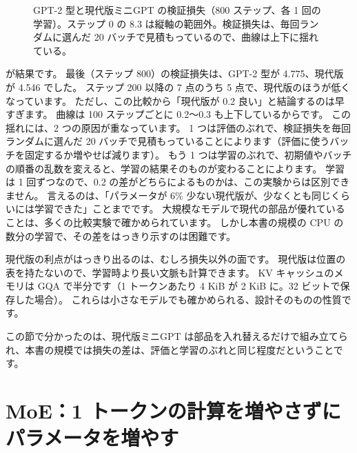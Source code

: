 \begin{figure}[tbp]
\centering
{}
\caption{GPT-2 型と現代版ミニGPT の検証損失（800 ステップ、各 1 回の学習）。ステップ 0 の 8.3 は縦軸の範囲外。検証損失は、毎回ランダムに選んだ 20 バッチで見積もっているので、曲線は上下に揺れている。}
\label{fig:ma-compare}
\end{figure}

が結果です。
最後（ステップ 800）の検証損失は、GPT-2 型が 4.775、現代版が 4.546 でした。
ステップ 200 以降の 7 点のうち 5 点で、現代版のほうが低くなっています。
ただし、この比較から「現代版が 0.2 良い」と結論するのは早すぎます。
曲線は 100 ステップごとに 0.2〜0.3 も上下しているからです。
この揺れには、2 つの原因が重なっています。
1 つは評価のぶれで、検証損失を毎回ランダムに選んだ 20 バッチで見積もっていることによります（評価に使うバッチを固定するか増やせば減ります）。
もう 1 つは学習のぶれで、初期値やバッチの順番の乱数を変えると、学習の結果そのものが変わることによります。
学習は 1 回ずつなので、0.2 の差がどちらによるものかは、この実験からは区別できません。
言えるのは、「パラメータが 6\% 少ない現代版が、少なくとも同じくらいには学習できた」ことまでです。
大規模なモデルで現代の部品が優れていることは、多くの比較実験で確かめられています\cite{shazeer2020glu,su2024roformer,touvron2023llama}。
しかし本書の規模の CPU の数分の学習で、その差をはっきり示すのは困難です。

現代版の利点がはっきり出るのは、むしろ損失以外の面です。
現代版は位置の表を持たないので、学習時より長い文脈も計算できます。
KV キャッシュのメモリは GQA で半分です（1 トークンあたり 4 KiB が 2 KiB に。32 ビットで保存した場合）。
これらは小さなモデルでも確かめられる、設計そのものの性質です。

この節で分かったのは、現代版ミニGPT は部品を入れ替えるだけで組み立てられ、本書の規模では損失の差は、評価と学習のぶれと同じ程度だということです。

\section{MoE：1 トークンの計算を増やさずにパラメータを増やす}\label{sec:ma-moe}

